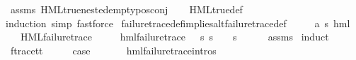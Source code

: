\begin{isabellebody}
%
\isatagproof
{}\isamarkupfalse%
\ assms\ HML{\isacharunderscore}{\kern0pt}true{\isacharunderscore}{\kern0pt}nested{\isacharunderscore}{\kern0pt}empty{\isacharunderscore}{\kern0pt}pos{\isacharunderscore}{\kern0pt}conj\isanewline
\ \ \isamarkupfalse%
\ HML{\isacharunderscore}{\kern0pt}true{\isacharunderscore}{\kern0pt}def\isanewline
\ \ \isamarkupfalse%
{\isacharparenleft}{\kern0pt}induction{\isacharcomma}{\kern0pt}\ simp{\isacharcomma}{\kern0pt}\ fastforce{\isacharparenright}{\kern0pt}%
\endisatagproof
{\isafoldproof}%
%
\isadelimproof
\isanewline
%
\endisadelimproof
\isanewline
{}\isamarkupfalse%
\ failure{\isacharunderscore}{\kern0pt}trace{\isacharunderscore}{\kern0pt}def{\isacharunderscore}{\kern0pt}implies{\isacharunderscore}{\kern0pt}alt{\isacharunderscore}{\kern0pt}failure{\isacharunderscore}{\kern0pt}trace{\isacharunderscore}{\kern0pt}def{\isacharcolon}{\kern0pt}\isanewline
\ \ \ {\isasymphi}\ {\isacharcolon}{\kern0pt}{\isacharcolon}{\kern0pt}\ {\isachardoublequoteopen}{\isacharparenleft}{\kern0pt}{\isacharprime}{\kern0pt}a{\isacharcomma}{\kern0pt}\ {\isacharprime}{\kern0pt}s{\isacharparenright}{\kern0pt}\ hml{\isachardoublequoteclose}\isanewline
\ \ \ {\isachardoublequoteopen}HML{\isacharunderscore}{\kern0pt}failure{\isacharunderscore}{\kern0pt}trace\ {\isasymphi}{\isachardoublequoteclose}\isanewline
\ \ \ {\isachardoublequoteopen}{\isasymexists}{\isasympsi}{\isachardot}{\kern0pt}\ hml{\isacharunderscore}{\kern0pt}failure{\isacharunderscore}{\kern0pt}trace\ {\isasympsi}\ {\isasymand}\ {\isacharparenleft}{\kern0pt}{\isasymforall}s{\isachardot}{\kern0pt}\ {\isacharparenleft}{\kern0pt}s\ {\isasymTurnstile}\ {\isasymphi}{\isacharparenright}{\kern0pt}\ {\isasymlongleftrightarrow}\ {\isacharparenleft}{\kern0pt}s\ {\isasymTurnstile}\ {\isasympsi}{\isacharparenright}{\kern0pt}{\isacharparenright}{\kern0pt}{\isachardoublequoteclose}\isanewline
%
\isadelimproof
\ \ %
\endisadelimproof
%
\isatagproof
{}\isamarkupfalse%
\ assms\ \isamarkupfalse%
{\isacharparenleft}{\kern0pt}induct{\isacharparenright}{\kern0pt}\isanewline
\ \ \isamarkupfalse%
\ f{\isacharunderscore}{\kern0pt}trace{\isacharunderscore}{\kern0pt}tt\isanewline
\ \ \isamarkupfalse%
\ \isamarkupfalse%
\ {\isacharquery}{\kern0pt}case\ \isanewline
\ \ \ \ \isamarkupfalse%
\ hml{\isacharunderscore}{\kern0pt}failure{\isacharunderscore}{\kern0pt}trace{\isachardot}{\kern0pt}intros{\isacharparenleft}{\kern0pt}{}{\isacharparenright}{\kern0pt}\ \isamarkupfalse%

\end{isabellebody}

